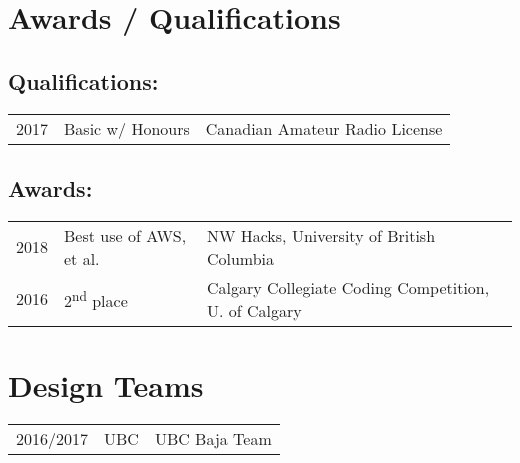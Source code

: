 \documentclass[]{deedy-resume-openfont}
\begin{document}
\begin{minipage}[t]{0.66\textwidth}

\section{Awards / Qualifications} 
\subsection{Qualifications:}
\begin{tabular}{rll}
2017         & Basic w/ Honours  & Canadian Amateur Radio License\\
\end{tabular}

\subsection{Awards:}
\begin{tabular}{rll}
2018         & Best use of AWS, et al.           & NW Hacks, University of British Columbia\\
2016         & 2\textsuperscript{nd} place  & Calgary Collegiate Coding Competition, U. of Calgary\\
\end{tabular}
\sectionsep


\section{Design Teams} 

\begin{tabular}{rll}
2016/2017   & UBC   & UBC Baja Team\\
\end{tabular}
\sectionsep

\end{minipage} 
\end{document}

